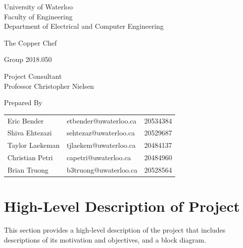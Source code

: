 \documentclass[11pt]{article}
\begin{document}

\begin{titlepage}
	\centering

	{\huge University of Waterloo \\}
	{\Large Faculty of Engineering \\}
	{\Large Department of Electrical and Computer Engineering}

	\vspace{1.2in}

	{\Huge The Copper Chef}

	\vspace{1.2in}

	{\Large Group 2018.050 \\}

	\vspace{1.2in}

	{\Large Project Consultant \\}
	{\large Professor Christopher Nielsen}

	\vspace{1.2in}

	{\Large Prepared By \\}

	\begin{table}[h!]
	\centering
	\begin{tabular}{l l r}
		{\large Eric Bender} & {\large etbender@uwaterloo.ca} & {\large 20534384} \\
		{\large Shiva Ehtezazi} & {\large sehtezaz@uwaterloo.ca} & {\large 20529687} \\
		{\large Taylor Laekeman} & {\large tjlaekem@uwaterloo.ca} & {\large 20484137} \\
		{\large Christian Petri} & {\large capetri@uwaterloo.ca} & {\large 20484960} \\
		{\large Brian Truong} & {\large b3truong@uwaterloo.ca} & {\large 20528564}
	\end{tabular}
	\end{table}
\end{titlepage}

\tableofcontents
\newpage
\listoffigures
\newpage
\listoftables
\newpage


\section{High-Level Description of Project}

This section provides a high-level description of the project that includes descriptions of its motivation and objectives, and a block diagram.
\end{document}
